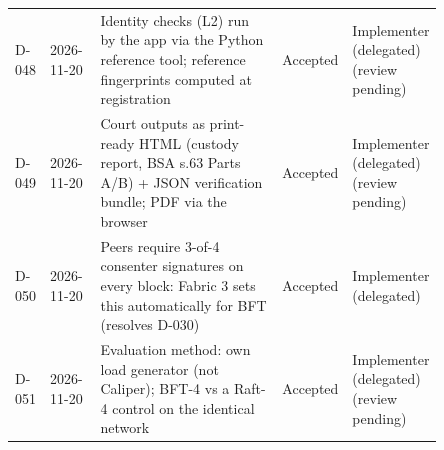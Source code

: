\begin{longtable}{@{}lp{0.12\linewidth}p{0.47\linewidth}p{0.13\linewidth}p{0.13\linewidth}@{}}
D-048 & 2026-11-20 & Identity checks (L2) run by the app via the Python reference tool; reference fingerprints computed at registration & Accepted & Implementer (delegated) (review pending)\\
D-049 & 2026-11-20 & Court outputs as print-ready HTML (custody report, BSA s.63 Parts A/B) + JSON verification bundle; PDF via the browser & Accepted & Implementer (delegated) (review pending)\\
D-050 & 2026-11-20 & Peers require 3-of-4 consenter signatures on every block: Fabric 3 sets this automatically for BFT (resolves D-030) & Accepted & Implementer (delegated)\\
D-051 & 2026-11-20 & Evaluation method: own load generator (not Caliper); BFT-4 vs a Raft-4 control on the identical network & Accepted & Implementer (delegated) (review pending)\\
\bottomrule
\end{longtable}
